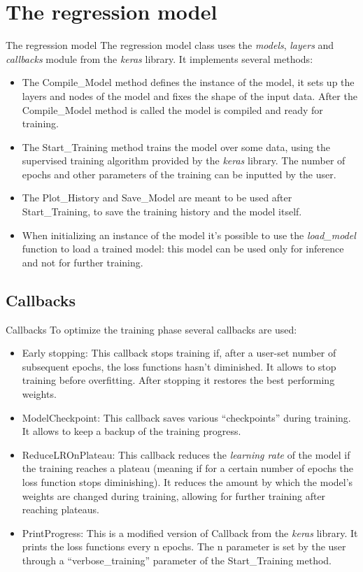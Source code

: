 \documentclass{beamer}
\begin{document}
\section{The regression model}
\begin{frame}{The regression model}
The regression model class uses the \emph{models}, \emph{layers} and \emph{callbacks} module from the \emph{keras} library.
It implements several methods:

\begin{itemize}
\item The Compile\_Model method defines the instance of the model, it sets up the layers and nodes of the model and fixes the shape of the input data. After the Compile\_Model method is called the model is compiled and ready for training.
\item The Start\_Training method trains the model over some data, using the supervised training algorithm provided by the \emph{keras} library. The number of epochs and other parameters of the training can be inputted by the user.
\item The Plot\_History and Save\_Model are meant to be used after Start\_Training, to save the training history and the model itself.
\item When initializing an instance of the model it's possible to use the \emph{load\_model} function to load a trained model: this model can be used only for inference and not for further training.
\end{itemize}

\end{frame}

\subsection{Callbacks}
\begin{frame}{Callbacks}
To optimize the training phase several callbacks are used:
    \begin{itemize}
        \item Early stopping:
			This callback stops training if, after a user-set number of subsequent epochs, the loss functions hasn't diminished. It allows to stop training before overfitting. After stopping it restores the best performing weights.
        \item ModelCheckpoint:
				This callback saves various ``checkpoints'' during training. It allows to keep a backup of the training progress.
        \item ReduceLROnPlateau:
				This callback reduces the \emph{learning rate} of the model if the training reaches a plateau (meaning if for a certain number of epochs the loss function stops diminishing). It reduces the amount by which the model's weights are changed during training, allowing for further training after reaching plateaus.
			\item PrintProgress:
				This is a modified version of Callback from the \emph{keras} library. It prints the loss functions every n epochs. The n parameter is set by the user through a ``verbose\_training'' parameter of the Start\_Training method.
    \end{itemize}
\end{frame}
\end{document}

